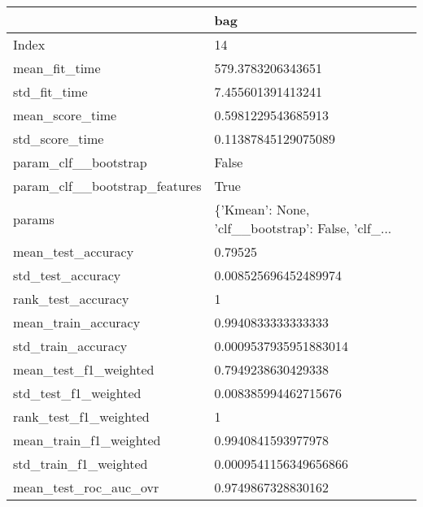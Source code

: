 \begin{tabular}{ll}
\toprule
{} &                                                bag \\
\midrule
Index                         &                                                 14 \\
mean\_fit\_time                 &                                  579.3783206343651 \\
std\_fit\_time                  &                                  7.455601391413241 \\
mean\_score\_time               &                                 0.5981229543685913 \\
std\_score\_time                &                                0.11387845129075089 \\
param\_clf\_\_bootstrap          &                                              False \\
param\_clf\_\_bootstrap\_features &                                               True \\
params                        &  \{'Kmean': None, 'clf\_\_bootstrap': False, 'clf\_... \\
mean\_test\_accuracy            &                                            0.79525 \\
std\_test\_accuracy             &                               0.008525696452489974 \\
rank\_test\_accuracy            &                                                  1 \\
mean\_train\_accuracy           &                                 0.9940833333333333 \\
std\_train\_accuracy            &                              0.0009537935951883014 \\
mean\_test\_f1\_weighted         &                                 0.7949238630429338 \\
std\_test\_f1\_weighted          &                               0.008385994462715676 \\
rank\_test\_f1\_weighted         &                                                  1 \\
mean\_train\_f1\_weighted        &                                 0.9940841593977978 \\
std\_train\_f1\_weighted         &                              0.0009541156349656866 \\
mean\_test\_roc\_auc\_ovr         &                                 0.9749867328830162 \\

\end{tabular}

